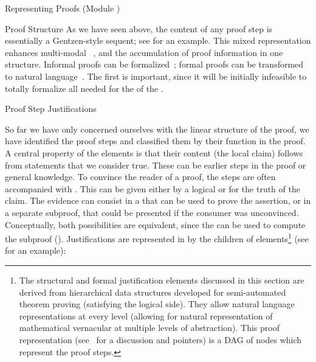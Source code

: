 \begin{omgroup}[id=proofs,short=Representing Proofs]{Representing Proofs (Module {})}
\begin{module}[id=proof-structure]
\begin{omgroup}[id=proof-text]{Proof Structure}
As we have seen above, the content of any proof step is essentially a Gentzen-style sequent; see
{} for an example. This mixed representation enhances multi-modal
{}~\cite{Fiedler:tape97}, and the accumulation of proof
information in one structure. Informal proofs can be formalized~\cite{Baur:susmt99};
formal proofs can be transformed to natural language~\cite{HuangFiedler:pmfp96}. The first
is important, since it will be initially infeasible to totally formalize all
{} needed for the {} of the
{}.
\end{omgroup}
\end{module}

\begin{module}[id=justifications]
\begin{omgroup}[id=proofs.justifications]{Proof Step Justifications}

\begin{omtext}
  So far we have only concerned ourselves with the linear structure of the proof, we have
  identified the proof steps and classified them by their function in the proof. A central
  property of the {} elements is that their content (the local claim)
  follows from statements that we consider true. These can be earlier steps in the proof
  or general knowledge. To convince the reader of a proof, the steps are often accompanied
  with .  This can be given either by a logical
  {} or {} for the truth of the
  claim.  The evidence can consist in a {} that can be used to
  prove the assertion, or in a separate subproof, that could be presented if the consumer
  was unconvinced.  Conceptually, both possibilities are equivalent, since the
  {} can be used to compute the subproof (). Justifications are represented in {\omdoc} by the
  {} children of {} elements\footnote{The structural and
    formal justification elements discussed in this section are derived from hierarchical
    data structures developed for semi-automated theorem proving (satisfying the logical
    side). They allow natural language representations at every level (allowing for
    natural representation of mathematical vernacular at multiple levels of abstraction).
    This proof representation (see~\cite{BenzmuellerEtAl:otama97} for a discussion and
    pointers) is a DAG of nodes which represent the proof steps.}  (see
  {} for an example):
\end{omtext}


\end{omgroup}
\end{module}
\end{omgroup}
